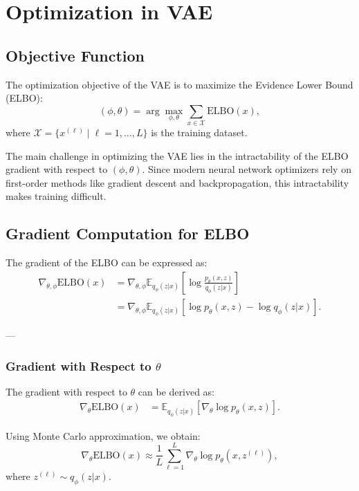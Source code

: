 \section{Optimization in VAE}

\subsection{Objective Function}
The optimization objective of the VAE is to maximize the Evidence Lower Bound (ELBO):
\begin{equation}
(\phi, \theta) = \arg\max_{\phi, \theta} \sum_{x \in \mathcal{X}} \text{ELBO}(x),
\end{equation}
where \(\mathcal{X} = \{x^{(\ell)} \mid \ell = 1, \dots, L\}\) is the training dataset.

The main challenge in optimizing the VAE lies in the intractability of the ELBO gradient with respect to \((\phi, \theta)\). Since modern neural network optimizers rely on first-order methods like gradient descent and backpropagation, this intractability makes training difficult.

\subsection{Gradient Computation for ELBO}
The gradient of the ELBO can be expressed as:
\begin{align}
\nabla_{\theta, \phi} \text{ELBO}(x) &= \nabla_{\theta, \phi} 
\mathbb{E}_{q_\phi(z|x)} 
\left[
\log \frac{p_\theta(x, z)}{q_\phi(z|x)}
\right] \nonumber \\
&= \nabla_{\theta, \phi} 
\mathbb{E}_{q_\phi(z|x)} 
\left[
\log p_\theta(x, z) - \log q_\phi(z|x)
\right].
\end{align}

---

\subsubsection*{Gradient with Respect to \(\theta\)}
The gradient with respect to \(\theta\) can be derived as:
\begin{align}
\nabla_\theta \text{ELBO}(x) &= \mathbb{E}_{q_\phi(z|x)}
\left[
\nabla_\theta \log p_\theta(x, z)
\right].
\end{align}

Using Monte Carlo approximation, we obtain:
\begin{equation}
\nabla_\theta \text{ELBO}(x) \approx 
\frac{1}{L} \sum_{\ell=1}^L 
\nabla_\theta \log p_\theta(x, z^{(\ell)}),
\end{equation}
where \(z^{(\ell)} \sim q_\phi(z|x)\).

